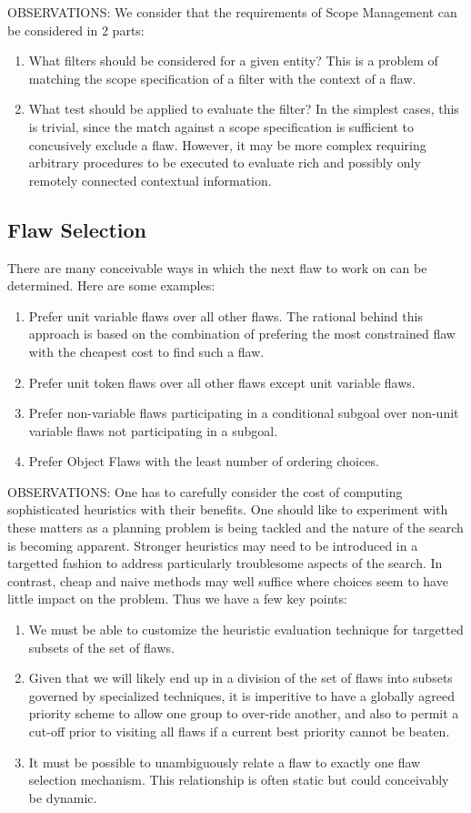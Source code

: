 \documentclass[10pt, letterpaper, twoside]{article}
\begin{document}
OBSERVATIONS: We consider that the requirements of Scope Management can be considered in 2 parts:
\begin{enumerate}
\item What filters should be considered for a given entity? This is a problem of matching the scope specification of a filter with the context of a flaw.
\item What test should be applied to evaluate the filter? In the simplest cases, this is trivial, since the match against a scope specification is sufficient to concusively exclude a flaw. However, it may be more complex requiring arbitrary procedures to be executed to evaluate rich and possibly only remotely connected contextual information.
\end{enumerate}

\subsection{Flaw Selection}
There are many conceivable ways in which the next flaw to work on can be determined. Here are some examples:
\begin{enumerate}
\item Prefer unit variable flaws over all other flaws. The rational behind this approach is based on the combination of prefering the most constrained flaw with the cheapest cost to find such a flaw.
\item Prefer unit token flaws over all other flaws except unit variable flaws.
\item Prefer non-variable flaws participating in a conditional subgoal over non-unit variable flaws not participating in a subgoal.
\item Prefer Object Flaws with the least number of ordering choices.
\end{enumerate}

OBSERVATIONS: One has to carefully consider the cost of computing sophisticated heuristics with their benefits. One should like to experiment with these matters as a planning problem is being tackled and the nature of the search is becoming apparent. Stronger heuristics may need to be introduced in a targetted fashion to address particularly troublesome aspects of the search. In contrast, cheap and naive methods may well suffice where choices seem to have little impact on the problem. Thus we have a few key points:
\begin{enumerate}
\item We must be able to customize the heuristic evaluation technique for targetted subsets of the set of flaws.
\item Given that we will likely end up in a division of the set of flaws into subsets governed by specialized techniques, it is imperitive to have a globally agreed priority scheme to allow one group to over-ride another, and also to permit a cut-off prior to visiting all flaws if a current best priority cannot be beaten.
\item It must be possible to unambiguously relate a flaw to exactly one flaw selection mechanism. This relationship is often static but could conceivably be dynamic.
\end{enumerate}
\end{document}
